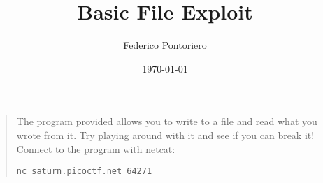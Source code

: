 \documentclass[11pt]{article}
\author{Federico Pontoriero}
\date{\today}
\title{Basic File Exploit}
\begin{document}
\maketitle
\tableofcontents

\begin{quote}
The program provided allows you to write to a file and read what you wrote from it.
Try playing around with it and see if you can break it!
Connect to the program with netcat:
\begin{verbatim}
nc saturn.picoctf.net 64271
\end{verbatim}
\end{quote}
\end{document}
